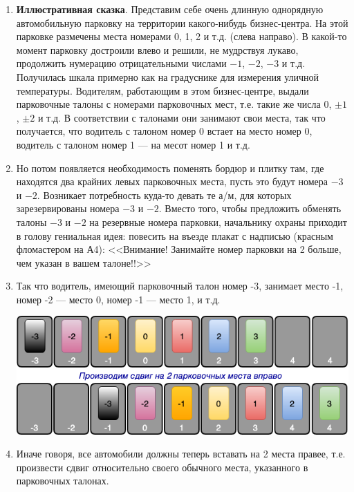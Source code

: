 

\begin{enumerate}
\item \textbf{Иллюстративная сказка}. Представим себе очень длинную однорядную автомобильную парковку на территории какого-нибудь бизнес-центра. На этой парковке размечены места номерами 0, 1, 2 и т.д. (слева направо). В какой-то момент парковку достроили влево и решили, не мудрствуя лукаво, продолжить нумерацию отрицательными числами $-1$, $-2$, $-3$ и т.д. Получилась шкала примерно как на градуснике для измерения уличной температуры. Водителям, работающим в этом бизнес-центре, выдали парковочные талоны с номерами парковочных мест, т.е. такие же числа 0, $\pm 1$, $\pm 2$ и т.д. В соответствии с талонами они занимают свои места, так что получается, что водитель с талоном номер 0 встает на место номер 0, водитель с талоном номер 1 --- на месот номер 1 и т.д.
\item Но потом появляется необходимость поменять бордюр и плитку там, где находятся два крайних левых парковочных места, пусть это будут номера $-3$ и $-2$. Возникает потребность куда-то девать те а/м, для которых зарезервированы номера $-3$ и $-2$. Вместо того, чтобы предложить обменять талоны $-3$ и $-2$ на резервные номера парковки, начальнику охраны приходит в голову гениальная идея: повесить на въезде плакат с надписью (красным фломастером на А4): <<Внимание! Занимайте номер парковки на 2 больше, чем указан в вашем талоне!!>>
\item Так что водитель, имеющий парковочный талон номер -3, занимает место -1, номер -2 --- место 0, номер -1 --- место 1, и т.д.
\begin{center}
\includegraphics[scale=0.6]{TT.png}
\end{center}
\item Иначе говоря, все автомобили должны теперь вставать на 2 места правее, т.е. произвести сдвиг относительно своего обычного места, указанного в парковочных талонах.

\end{enumerate}
